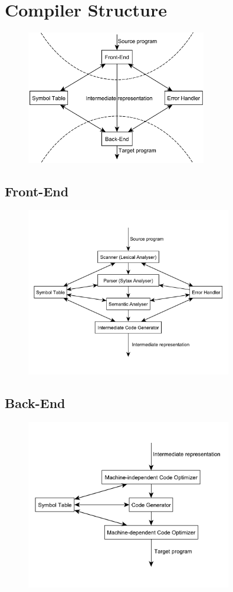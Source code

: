 \section{Compiler Structure}
\begin{figure}[H]
    \centerline{\includegraphics[width=0.7\textwidth]{img/10.pdf}}
\end{figure}

\subsection{Front-End}
\begin{figure}[H]
    \centerline{\includegraphics[width=0.8\textwidth]{img/11.pdf}}
\end{figure}

\subsection{Back-End}
\begin{figure}[H]
    \centerline{\includegraphics[width=0.8\textwidth]{img/12.pdf}}
\end{figure}